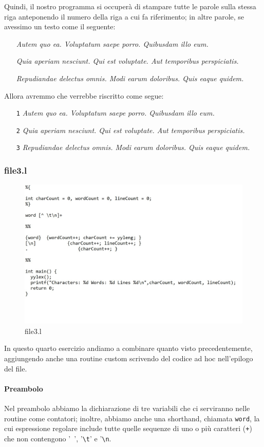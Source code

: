 \documentclass[class=book, crop=false, oneside, 12pt]{standalone}
\begin{document}
\noindent Quindi, il nostro programma si occuperà di stampare tutte le parole sulla stessa riga anteponendo il numero della riga a cui fa riferimento; in altre parole, se avessimo un testo come il seguente:
\begin{itemize}[noitemsep]
    \item[] \emph{Autem quo ea. Voluptatum saepe porro. Quibusdam illo eum.}
    \item[] \emph{Quia aperiam nesciunt. Qui est voluptate. Aut temporibus perspiciatis.}
    \item[] \emph{Repudiandae delectus omnis. Modi earum doloribus. Quis eaque quidem.}
\end{itemize}
Allora avremmo che verrebbe riscritto come segue:
\begin{enumerate}[noitemsep]
    \item[\texttt{1}] \emph{Autem quo ea. Voluptatum saepe porro. Quibusdam illo eum.}
    \item[\texttt{2}] \emph{Quia aperiam nesciunt. Qui est voluptate. Aut temporibus perspiciatis.}
    \item[\texttt{3}] \emph{Repudiandae delectus omnis. Modi earum doloribus. Quis eaque quidem.}
\end{enumerate}

\subsubsection{file3.l}
\begin{figure}[h]
    \centering
    \includegraphics[width=.7\textwidth,keepaspectratio]{file3.l.jpg}
    \caption{file3.l}
    \label{file3.l}
\end{figure}
In questo quarto esercizio andiamo a combinare quanto visto precedentemente, aggiungendo anche una routine custom scrivendo del codice ad hoc nell'epilogo del file.

\paragraph{Preambolo}
Nel preambolo abbiamo la dichiarazione di tre variabili che ci serviranno nelle routine come contatori; inoltre, abbiamo anche una shorthand, chiamata \texttt{word}, la cui espressione regolare include tutte quelle sequenze di uno o più caratteri (\texttt{+}) che non contengono '\texttt{ }', '\texttt{\textbackslash t}' e '\texttt{\textbackslash n}.
\end{document}

